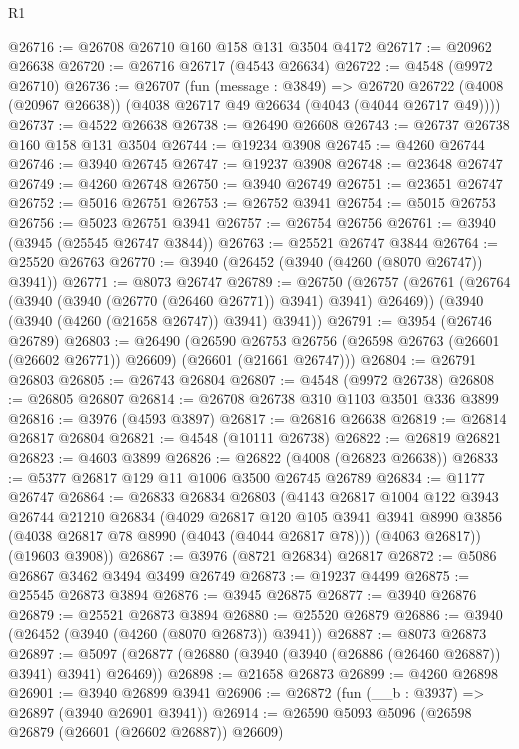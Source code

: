\begin{lexlean}{R1}
\begin{coremodule}
@26716 := @26708 @26710 @160 @158 @131 @3504 @4172
@26717 := @20962 @26638
@26720 := @26716 @26717 (@4543 @26634)
@26722 := @4548 (@9972 @26710)
@26736 := @26707
    (fun (message : @3849) =>
    @26720 @26722 (@4008 (@20967 @26638)) (@4038 @26717 @49 @26634 (@4043 (@4044 @26717 @49))))
@26737 := @4522 @26638
@26738 := @26490 @26608
@26743 := @26737 @26738 @160 @158 @131 @3504
@26744 := @19234 @3908
@26745 := @4260 @26744
@26746 := @3940 @26745
@26747 := @19237 @3908
@26748 := @23648 @26747
@26749 := @4260 @26748
@26750 := @3940 @26749
@26751 := @23651 @26747
@26752 := @5016 @26751
@26753 := @26752 @3941
@26754 := @5015 @26753
@26756 := @5023 @26751 @3941
@26757 := @26754 @26756
@26761 := @3940 (@3945 (@25545 @26747 @3844))
@26763 := @25521 @26747 @3844
@26764 := @25520 @26763
@26770 := @3940 (@26452 (@3940 (@4260 (@8070 @26747)) @3941))
@26771 := @8073 @26747
@26789 := @26750
    (@26757
      (@26761 (@26764 (@3940 (@3940 (@26770 (@26460 @26771)) @3941) @3941) @26469))
      (@3940 (@3940 (@4260 (@21658 @26747)) @3941) @3941))
@26791 := @3954 (@26746 @26789)
@26803 := @26490
    (@26590 @26753 @26756 (@26598 @26763 (@26601 (@26602 @26771)) @26609) (@26601 (@21661 @26747)))
@26804 := @26791 @26803
@26805 := @26743 @26804
@26807 := @4548 (@9972 @26738)
@26808 := @26805 @26807
@26814 := @26708 @26738 @310 @1103 @3501 @336 @3899
@26816 := @3976 (@4593 @3897)
@26817 := @26816 @26638
@26819 := @26814 @26817 @26804
@26821 := @4548 (@10111 @26738)
@26822 := @26819 @26821
@26823 := @4603 @3899
@26826 := @26822 (@4008 (@26823 @26638))
@26833 := @5377 @26817 @129 @11 @1006 @3500 @26745 @26789
@26834 := @1177 @26747
@26864 := @26833
    @26834
    @26803
    (@4143
      @26817
      @1004
      @122
      @3943
      @26744
      @21210
      @26834
      (@4029
        @26817
        @120
        @105
        @3941
        @3941
        @8990
        @3856
        (@4038 @26817 @78 @8990 (@4043 (@4044 @26817 @78)))
        (@4063 @26817))
      (@19603 @3908))
@26867 := @3976 (@8721 @26834) @26817
@26872 := @5086 @26867 @3462 @3494 @3499 @26749
@26873 := @19237 @4499
@26875 := @25545 @26873 @3894
@26876 := @3945 @26875
@26877 := @3940 @26876
@26879 := @25521 @26873 @3894
@26880 := @25520 @26879
@26886 := @3940 (@26452 (@3940 (@4260 (@8070 @26873)) @3941))
@26887 := @8073 @26873
@26897 := @5097 (@26877 (@26880 (@3940 (@3940 (@26886 (@26460 @26887)) @3941) @3941) @26469))
@26898 := @21658 @26873
@26899 := @4260 @26898
@26901 := @3940 @26899 @3941
@26906 := @26872 (fun (__b : @3937) => @26897 (@3940 @26901 @3941))
@26914 := @26590 @5093 @5096 (@26598 @26879 (@26601 (@26602 @26887)) @26609)

\end{coremodule}
\end{lexlean}
